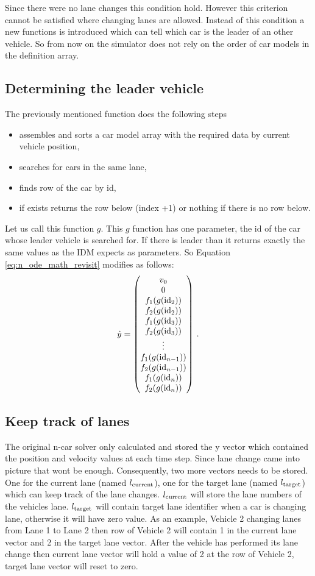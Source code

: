 		Since there were no lane changes this condition hold. However this criterion cannot be satisfied where changing lanes are allowed. Instead of this condition a new functions is introduced which can tell which car is the leader of an other vehicle. So from now on the simulator does not rely on the order of car models in the definition array.
		\subsection*{Determining the leader vehicle}
		The previously mentioned function does the following steps
		\begin{itemize}
			\item assembles and sorts a car model array with the required data by current vehicle position,
			\item searches for cars in the same lane,
			\item finds row of the car by id,
			\item if exists returns the row below (index +1) or nothing if there is no row below.
		\end{itemize}
		Let us call this function $g$. This $g$ function has one parameter, the id of the car whose leader vehicle is searched for. If there is leader than it returns exactly the same values as the IDM expects as parameters.
		So Equation \ref{eq:n_ode_math_revisit} modifies as follows:
		\begin{equation}
			\dot{y}=
			\begin{pmatrix}
			v_0\\
			0\\
			f_1(g({\rm id}_2))\\
			f_2(g({\rm id}_2))\\
			f_1(g({\rm id}_3))\\
			f_2(g({\rm id}_3))\\
			\vdots\\
			f_1(g({\rm id}_{n-1}))\\
			f_2(g({\rm id}_{n-1}))\\
			f_1(g({\rm id}_{n}))\\
			f_2(g({\rm id}_{n}))
			\end{pmatrix}\,.
			\label{eq:n_ode_math_with_find_leading}
		\end{equation}
		\subsection*{Keep track of lanes}
		The original n-car solver only calculated and stored the y vector which contained the position and velocity values at each time step. Since lane change came into picture that wont be enough. Consequently, two more vectors needs to be stored. One for the current lane (named $l_{\rm current}$), one for the target lane (named $l_{\rm target}$) which can keep track of the lane changes. $l_{\rm current}$ will store the lane numbers of the vehicles lane. $l_{\rm target}$ will contain target lane identifier when a car is changing lane, otherwise it will have zero value. As an example, Vehicle 2 changing lanes from Lane 1 to Lane 2 then row of Vehicle 2 will contain 1 in the current lane vector and 2 in the target lane vector. After the vehicle has performed its lane change then current lane vector will hold a value of 2 at the row of Vehicle 2, target lane vector will reset to zero.
